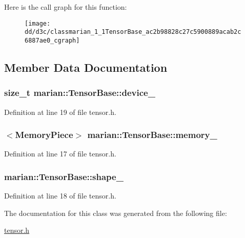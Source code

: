 Here is the call graph for this function\+:
\nopagebreak
\begin{figure}[H]
\begin{center}
\leavevmode
\texttt{[image: dd/d3c/classmarian\_1\_1TensorBase\_ac2b98828c27c5900889acab2c6887ae0\_cgraph]}
\end{center}
\end{figure}




\subsection{Member Data Documentation}
\subsubsection[{\texorpdfstring{device\+\_\+}{device_}}]{\setlength{\rightskip}{0pt plus 5cm}size\+\_\+t marian\+::\+Tensor\+Base\+::device\+\_\+\hspace{0.3cm}{\ttfamily [private]}}\hypertarget{classmarian_1_1TensorBase_a67a05977eed105fde5c494ce332564ff}{}\label{classmarian_1_1TensorBase_a67a05977eed105fde5c494ce332564ff}


Definition at line 19 of file tensor.\+h.

\subsubsection[{\texorpdfstring{memory\+\_\+}{memory_}}]{$<${\bf Memory\+Piece}$>$ marian\+::\+Tensor\+Base\+::memory\+\_\+\hspace{0.3cm}{\ttfamily [private]}}\hypertarget{classmarian_1_1TensorBase_a3283bb8429b1225b1790a5569cda8022}{}\label{classmarian_1_1TensorBase_a3283bb8429b1225b1790a5569cda8022}


Definition at line 17 of file tensor.\+h.

\subsubsection[{\texorpdfstring{shape\+\_\+}{shape_}}]{ marian\+::\+Tensor\+Base\+::shape\+\_\+\hspace{0.3cm}{\ttfamily [private]}}\hypertarget{classmarian_1_1TensorBase_acf1bac1c20fdd4cbed780b74ad05bcae}{}\label{classmarian_1_1TensorBase_acf1bac1c20fdd4cbed780b74ad05bcae}


Definition at line 18 of file tensor.\+h.



The documentation for this class was generated from the following file\+:\begin{DoxyCompactItemize}
\item 
\hyperlink{tensor_8h}{tensor.\+h}\end{DoxyCompactItemize}
